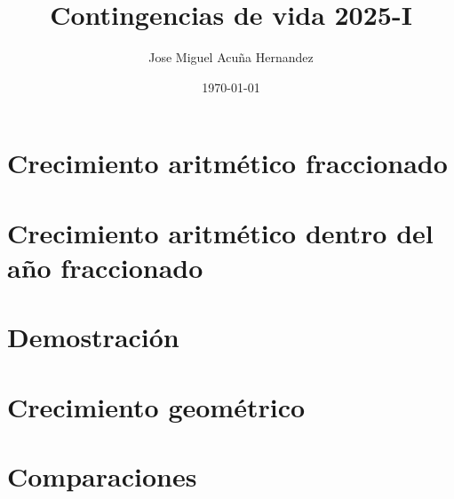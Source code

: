 \documentclass{article}
\title{Contingencias de vida 2025-I}
\author{Jose Miguel Acuña Hernandez}
\date{\today}
\begin{document}
\thispagestyle{firstpage}
\vspace*{9\baselineskip}

\renewcommand{\contentsname}{}
\begin{cuadrocontenido}
  \tableofcontents
\end{cuadrocontenido}

\section{Crecimiento aritmético fraccionado}


\section{Crecimiento aritmético dentro del año fraccionado}


\section{Demostración}


\section{Crecimiento geométrico}

    
\section{Comparaciones}

\end{document}
